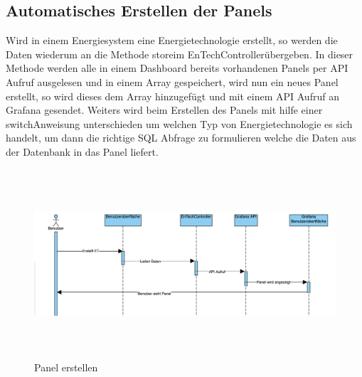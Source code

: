\subsection{Automatisches Erstellen der Panels}\label{sec: Panels}
Wird in einem Energiesystem eine Energietechnologie erstellt, so werden die Daten wiederum an die Methode \glqq store\grqq \space im \glqq EnTechController\grqq \space übergeben. In dieser Methode werden alle in einem Dashboard bereits vorhandenen Panels per API Aufruf ausgelesen und in einem Array gespeichert, wird nun ein neues Panel erstellt, so wird dieses dem Array hinzugefügt und mit einem API Aufruf an Grafana gesendet. Weiters wird beim Erstellen des Panels mit hilfe einer \glqq switch\grqq \space Anweisung unterschieden um welchen Typ von Energietechnologie es sich handelt, um dann die richtige SQL Abfrage zu formulieren welche die Daten aus der Datenbank in das Panel liefert. 
\begin{figure}[h]
	\centering
	\includegraphics[height=7cm,width=16cm]{images/GrafanaETerstellen}
	\caption{Panel erstellen}
	\label{fig:PanelErstellen }
\end{figure} 


